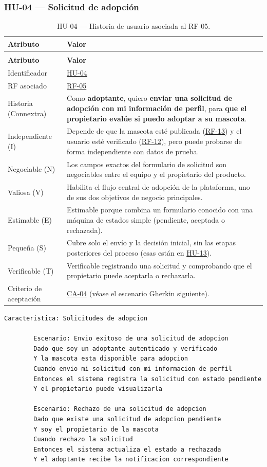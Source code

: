 \documentclass[journal,onecolumn]{IEEEtran}
\makeatletter
\newenvironment{atributos}[2]{%
	\small
	\begin{longtable}{@{}>{\raggedright\arraybackslash}p{4.2cm} >{\raggedright\arraybackslash}p{11.2cm}@{}}
		\caption{#2}\label{tab:#1}\\
		\toprule
		\textbf{Atributo} & \textbf{Valor} \\
		\midrule
		\endfirsthead
		\multicolumn{2}{@{}l}{\small\itshape (continuación)}\\
		\toprule
		\textbf{Atributo} & \textbf{Valor} \\
		\midrule
		\endhead
		\bottomrule
		\endlastfoot
	}{%
	\end{longtable}
	\normalsize
}
\makeatother
\begin{document}
	\subsubsection{HU-04 --- Solicitud de adopción}
	
	\begin{atributos}{HU-04}{HU-04 --- Historia de usuario asociada al RF-05.}
		Identificador & \hyperref[tab:HU-04]{HU-04} \\
		RF asociado & \hyperref[tab:RF-05]{RF-05} \\
		Historia (Connextra) & Como \textbf{adoptante}, quiero \textbf{enviar una solicitud de adopción con mi información de perfil}, para \textbf{que el propietario evalúe si puedo adoptar a su mascota}. \\
		Independiente (I) & Depende de que la mascota esté publicada (\hyperref[tab:RF-13]{RF-13}) y el usuario esté verificado (\hyperref[tab:RF-12]{RF-12}), pero puede probarse de forma independiente con datos de prueba. \\
		Negociable (N) & Los campos exactos del formulario de solicitud son negociables entre el equipo y el propietario del producto. \\
		Valiosa (V) & Habilita el flujo central de adopción de la plataforma, uno de sus dos objetivos de negocio principales. \\
		Estimable (E) & Estimable porque combina un formulario conocido con una máquina de estados simple (pendiente, aceptada o rechazada). \\
		Pequeña (S) & Cubre solo el envío y la decisión inicial, sin las etapas posteriores del proceso (esas están en \hyperref[tab:HU-13]{HU-13}). \\
		Verificable (T) & Verificable registrando una solicitud y comprobando que el propietario puede aceptarla o rechazarla. \\
		Criterio de aceptación & \hyperref[lst:ca04]{CA-04} (véase el escenario Gherkin siguiente). \\
	\end{atributos}
	
	\begin{lstlisting}[style=gherkin,caption={CA-04 --- Escenario de aceptación de la historia HU-04.},label={lst:ca04}]
		Caracteristica: Solicitudes de adopcion
		
		Escenario: Envio exitoso de una solicitud de adopcion
		Dado que soy un adoptante autenticado y verificado
		Y la mascota esta disponible para adopcion
		Cuando envio mi solicitud con mi informacion de perfil
		Entonces el sistema registra la solicitud con estado pendiente
		Y el propietario puede visualizarla
		
		Escenario: Rechazo de una solicitud de adopcion
		Dado que existe una solicitud de adopcion pendiente
		Y soy el propietario de la mascota
		Cuando rechazo la solicitud
		Entonces el sistema actualiza el estado a rechazada
		Y el adoptante recibe la notificacion correspondiente
	\end{lstlisting}
	
\end{document}
